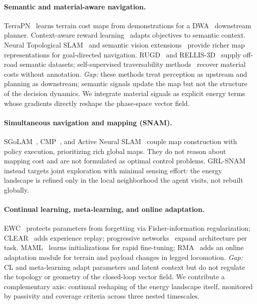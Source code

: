\paragraph{Semantic and material-aware navigation.}
TerraPN~\citep{sathyamoorthy2022terrapn} learns terrain cost maps from
demonstrations for a DWA~\citep{fox1997dynamic} downstream planner.
Context-aware reward learning~\citep{wang2024crl} adapts objectives
to semantic context.
Neural Topological SLAM~\citep{chaplot2020neuraltopologicalslamvisual} and semantic vision
extensions~\citep{zhang2025semantic} provide richer map representations
for goal-directed navigation.
RUGD~\citep{rugd2019} and RELLIS-3D~\citep{rellis2020} supply off-road
semantic datasets; self-supervised traversability
methods~\citep{mclennan2025learning} recover material costs without
annotation.
\emph{Gap:} these methods treat perception as upstream and planning as
downstream; semantic signals update the map but not the structure of the
decision dynamics.
We integrate material signals as explicit energy terms whose
gradients directly reshape the phase-space vector field.

\paragraph{Simultaneous navigation and mapping (SNAM).}
SGoLAM~\citep{kim2021sgolamsimultaneousgoallocalization}, CMP~\citep{gupta2019cognitivemappingplanningvisual}, and
Active Neural SLAM~\citep{chaplot2020learning} couple map construction
with policy execution, prioritizing rich global maps.
They do not reason about mapping cost and are not formulated as optimal
control problems.
GRL-SNAM instead targets joint exploration with minimal sensing effort:
the energy landscape is refined only in the local neighborhood the agent
visits, not rebuilt globally.

\paragraph{Continual learning, meta-learning, and online adaptation.}
EWC~\citep{kirkpatrick2017ewc} protects parameters from forgetting via
Fisher-information regularization; CLEAR~\citep{rolnick2019experience}
adds experience replay; progressive networks~\citep{rusu2016progressive}
expand architecture per task.
MAML~\citep{finn2017maml} learns initializations for rapid fine-tuning;
RMA~\citep{kumar2021rma} adds an online adaptation module for terrain
and payload changes in legged locomotion.
\emph{Gap:} CL and meta-learning adapt parameters and latent context but
do not regulate the topology or geometry of the closed-loop vector
field.
We contribute a complementary axis: continual reshaping of
the energy landscape itself, monitored by passivity and coverage
criteria across three nested timescales.

